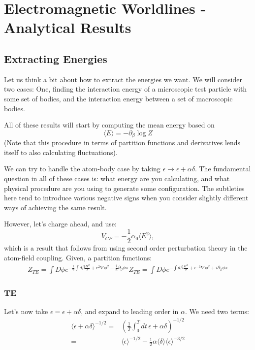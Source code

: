 \chapter{Electromagnetic Worldlines - Analytical Results}
\label{ch:analytical}
\section{Extracting Energies}

Let us think a bit about how to extract the energies we want.
  We will consider two cases: 
 One, finding the interaction energy of a microscopic test particle with some set of bodies,
 and the interaction energy between a set of macroscopic bodies. 

All of these results will start by computing the mean energy based on 
\begin{equation}
\langle E\rangle = -\partial_\beta\log Z
\end{equation}
(Note that this procedure in terms of partition functions and derivatives lends itself to also calculating fluctuations).  

We can try to handle the atom-body case by taking $\epsilon \rightarrow \epsilon + \alpha\delta$.
  The fundamental question in all of these cases is: what energy are you calculating, 
and what physical procedure are you using to generate some configuration.
  The subtleties here tend to introduce various negative signs when you consider slightly different ways of achieving the same result.  

However, let's charge ahead, and use: 
\begin{equation}
V_{CP} = -\frac{1}{2}\alpha_0\langle E^2\rangle,
\end{equation}
which is a result that follows from using second order perturbation theory in the atom-field coupling.
  Given, a partition functions: 
\begin{align}
Z_{TE} = \int D\phi e^{-\frac{1}{2}\int d\beta \frac{\Pi^2}{\epsilon} + c^2\nabla\phi^2+\frac{i}{\hbar}\partial_\beta\phi \pi  }
Z_{TE} = \int D\phi e^{-\int d\beta \frac{\Pi^2}{2} + \epsilon^{-1}\nabla\phi^2+i\partial_\beta\phi \pi  }
\end{align}

\subsection{TE}
Let's now take $\epsilon = \epsilon+\alpha\delta$, and expand to leading order in $\alpha.$  
We need two terms:
\begin{align}
\langle\epsilon+\alpha\delta\rangle^{-1/2} =&  \left(\frac{1}{T}\int_0^Tdt\,\epsilon + \alpha\delta\right)^{-1/2}\\
=& \langle\epsilon\rangle^{-1/2} -\frac{1}{2}\alpha\langle\delta\rangle\langle\epsilon\rangle^{-3/2}
\end{align}
